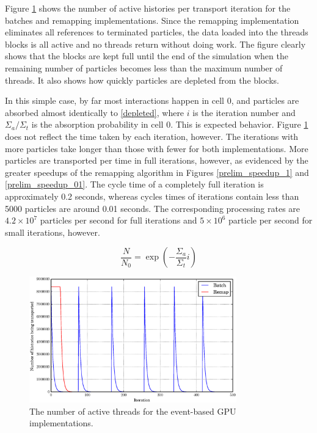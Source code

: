 Figure \ref{prelim_active} shows the number of active histories per transport iteration for the batches and remapping implementations.  Since the remapping implementation eliminates all references to terminated particles, the data loaded into the threads blocks is all active and no threads return without doing work.  The figure clearly shows that the blocks are kept full until the end of the simulation when the remaining number of particles becomes less than the maximum number of threads.  It also shows how quickly particles are depleted from the blocks.  

In this simple case, by far most interactions happen in cell 0, and particles are absorbed almost identically to \eqref{depleted}, where $i$ is the iteration number and $\Sigma_a/\Sigma_t$ is the absorption probability in cell 0.  This is expected behavior. %
  Figure \ref{prelim_active} does not reflect the time taken by each iteration, however.  The iterations with more particles take longer than those with fewer for both implementations.  More particles are transported per time in full iterations, however, as evidenced by the greater speedups of the remapping algorithm in Figures \ref{prelim_speedup_1} and \ref{prelim_speedup_01}.   The cycle time of a completely full iteration is approximately 0.2 seconds, whereas cycles times of iterations contain less than 5000 particles are around 0.01 seconds.  The corresponding processing rates are $4.2\times10^7$ particles per second for full iterations and $5\times10^6$ particle per second for small iterations, however. %

\begin{equation}
\label{depleted}
\frac{N}{N_0}=\exp \left(-\frac{\Sigma_a}{\Sigma_t} i \right)
\end{equation}

\begin{figure}[h!] 
  \centering
    \includegraphics[width=0.8\textwidth]{graphics/prelim_active.eps}
     \caption{The number of active threads for the event-based GPU implementations. \label{prelim_active} }
\end{figure}

